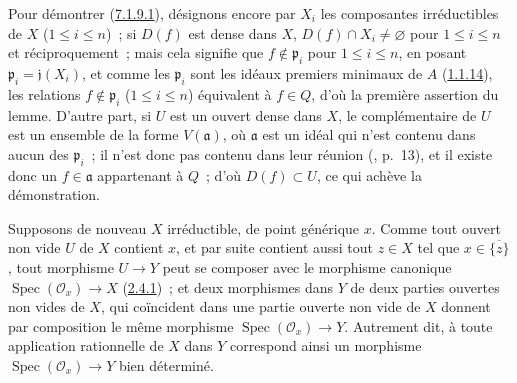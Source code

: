 Pour démontrer (\hyperref[I.7.1.9.1-fr]{7.1.9.1}), désignons encore par $X_i$
les composantes irréductibles de $X$ ($1\leq i\leq n$)~; si $D(f)$ est dense
dans $X$, $D(f)\cap X_i\neq\varnothing$ pour $1\leq i\leq n$ et
réciproquement~; mais cela signifie que $f\notin\mathfrak{p}_i$ pour
$1\leq i\leq n$, en posant $\mathfrak{p}_i=\mathfrak{j}(X_i)$, et comme les
$\mathfrak{p}_i$ sont les idéaux premiers minimaux de $A$
(\hyperref[I.1.1.14-fr]{1.1.14}), les relations
$f\notin\mathfrak{p}_i$ ($1\leq i\leq n$) équivalent à $f\in Q$, d'où la
première assertion du lemme. D'autre part, si $U$ est un ouvert dense dans $X$,
le complémentaire de $U$ est un ensemble de la forme $V(\mathfrak{a})$, où
$\mathfrak{a}$ est un idéal qui n'est contenu dans aucun des $\mathfrak{p}_i$~;
il n'est donc pas contenu dans leur réunion (\cite{I-10}, p.~13), et il existe
donc un $f\in\mathfrak{a}$ appartenant à $Q$~; d'où $D(f)\subset U$, ce qui
achève la démonstration.

\begin{env}[7.1.10]
\label{I.7.1.10-fr}
Supposons de nouveau $X$ irréductible, de point générique $x$. Comme tout
ouvert non vide $U$ de $X$ contient $x$, et par suite contient aussi tout
$z\in X$ tel que $x\in\overline{\{z\}}$, tout morphisme $U\to Y$ peut se
composer avec le morphisme canonique $\operatorname{Spec}(\mathscr{O}_x)\to X$
(\hyperref[I.2.4.1-fr]{2.4.1})~; et deux morphismes dans $Y$ de deux parties
ouvertes non vides de $X$, qui coïncident dans une partie ouverte non vide de
$X$ donnent par composition le même morphisme
$\operatorname{Spec}(\mathscr{O}_x)\to Y$. Autrement dit, à toute application
rationnelle de $X$ dans $Y$ correspond ainsi un morphisme
$\operatorname{Spec}(\mathscr{O}_x)\to Y$ bien déterminé.
\end{env}

